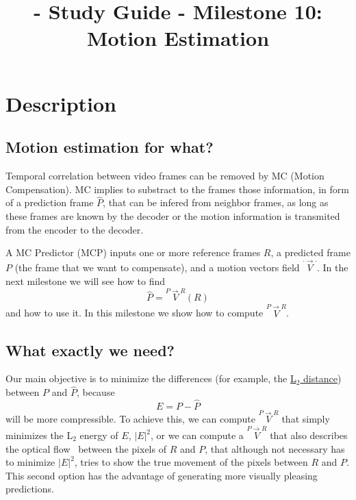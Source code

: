 
\title{\SM{} - Study Guide - Milestone 10: Motion Estimation}

\maketitle

\section{Description}

\subsection{Motion estimation for what?}
Temporal correlation between video frames can be removed by MC (Motion
Compensation). MC implies to substract to the frames those
information, in form of a prediction frame $\hat{P}$, that can be
infered from neighbor frames, as long as these frames are known by the
decoder or the motion information is transmited from the encoder to
the decoder.

A MC Predictor (MCP) inputs one or more reference frames $R$, a
predicted frame $P$ (the frame that we want to compensate), and a
motion vectors field $\overset{\cdot\rightarrow\cdot}{V}$. In the next
milestone we will see how to find
\begin{equation}
  \hat{P} =  \overset{P\rightarrow R}{V}(R)
\end{equation}
and how to use it. In this milestone we show how to compute
$\overset{P\rightarrow R}{V}$.

\subsection{What exactly we need?}
Our main objective is to minimize the differences (for example, the
\href{https://en.wikipedia.org/wiki/Euclidean_distance}{L$_2$
  distance}) between $P$ and $\hat{P}$, because
\begin{equation}
  E=P-\hat{P}
\end{equation}
will be more compressible. To achieve this, we can compute
$\overset{P\rightarrow R}{V}$ that simply minimizes the L$_2$ energy
of $E$, $|E|^2$, or we can compute a $\overset{P\rightarrow R}{V}$
that also describes the optical flow~\cite{horn1981determining}
between the pixels of $R$ and $P$, that although not necessary has to
minimize $|E|^2$, tries to show the true movement of the pixels
between $R$ and $P$. This second option has the advantage of generating
more visually pleasing predictions.


